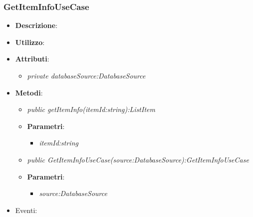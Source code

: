 \subsubsection{GetItemInfoUseCase}
\begin{itemize}
\item \textbf{Descrizione}: 
\item \textbf{Utilizzo}:
\item \textbf{Attributi}: 
	\begin{itemize}
	\item \textit{private databaseSource:DatabaseSource}\\
	
	\end{itemize}
\item \textbf{Metodi}:
	\begin{itemize}
	\item \textit{public getItemInfo(itemId:string):ListItem}\\
	
			\item{\textbf{Parametri}: \begin{itemize}
			\item \textit{itemId:string}\\

			\end{itemize}}
			\item \textit{public GetItemInfoUseCase(source:DatabaseSource):GetItemInfoUseCase}\\
			
				\item{\textbf{Parametri}: \begin{itemize}
				\item \textit{source:DatabaseSource}\\

			\end{itemize}}
	\end{itemize}
\item{Eventi}:
\end{itemize}

